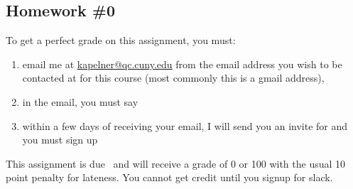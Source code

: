 \subsection*{Homework \#0}\label{subsec:homework_zero}

To get a perfect grade on this assignment, you must:

\begin{enumerate}[(1)]
\item email me at \href{kapelner@qc.cuny.edu}{kapelner@qc.cuny.edu} from the email address you wish to be contacted at for this course (most commonly this is a gmail address),
\item in the email, you must say 
\extrahwzero
\item within a few days of receiving your email, I will send you an invite for \slacklink and you must sign up
\end{enumerate}

This assignment is due \hwzerodue~and will receive a grade of 0 or 100 with the usual 10 point penalty for lateness. You cannot get credit until you signup for slack. 